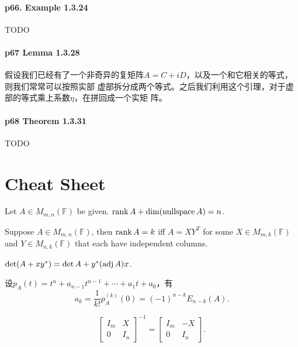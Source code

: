   \paragraph{p66. Example 1.3.24}
    TODO

  \paragraph{p67 Lemma 1.3.28}
    假设我们已经有了一个非奇异的复矩阵$A=C+iD$，以及一个和它相关的等式，则我们常常可以按照实部
    虚部拆分成两个等式。之后我们利用这个引理，对于虚部的等式乘上系数$\eta$，在拼回成一个实矩
    阵。

  \paragraph{p68 Theorem 1.3.31} TODO


\newpage
\section{Cheat Sheet}
  \begin{thm}
    Let $A\in M_{m,n}(\mathbb{F})$ be given. $\operatorname{rank} A + \dim(\operatorname{nullspace} A) = n$.
  \end{thm}

  \begin{lemma}
    Suppose $A\in M_{m,n}(\mathbb{F})$, then $\operatorname{rank} A = k$ iff $A=XY^T$ for some
    $X\in M_{m,k}(\mathbb{F})$ and $Y\in M_{n,k}(\mathbb{F})$ that each have 
    independent columns.
  \end{lemma}

  \begin{lemma}
    $\det(A+xy^*) = \det A + y^*(\operatorname{adj} A)x$.
  \end{lemma}

  \begin{lemma}[特征多项式系数]
    设$p_A(t)=t^n+a_{n-1}t^{n-1}+\cdots+a_1t+a_0$，有
    \[
      a_k = \frac{1}{k!}p_A^{(k)}(0) = (-1)^{n-k}E_{n-k}(A).
    \]
  \end{lemma}

  \begin{lemma}
    \[
      \begin{bmatrix}
        I_m & X \\
        0   & I_n
      \end{bmatrix}^{-1}
      = \begin{bmatrix}
        I_m & -X \\
        0   & I_n
      \end{bmatrix}.
    \]
  \end{lemma}


